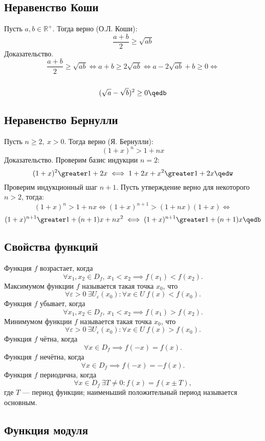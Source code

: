 \subsection{Неравенство Коши}

Пусть $a,b\in \mathbb{R}^+$. Тогда верно {\ital\color{desc}(О.Л. Коши)}:
$$\frac{a+b}{2}\geq \sqrt{ab}$$
{\bold Доказательство.}
$$\frac{a+b}{2}\geq \sqrt{ab}\iff a+b\geq 2\sqrt{ab}\iff a-2\sqrt{ab}+b\geq 0\iff$$
\\[-11pt]
$$(\sqrt{a}-\sqrt{b})^2\geq 0\qedb$$

\subsection{Неравенство Бернулли}

Пусть $n\geq 2,\ x\greater 0$. Тогда верно {\ital\color{desc}(Я. Бернулли)}:
$$(1+x)^n\greater 1+nx$$
{\bold Доказательство.} Проверим базис индукции $n=2$:
$$(1+x)^2\greater 1+2x\iff 1+2x+x^2\greater 1+2x\qedw$$
Проверим индукционный шаг $n+1$. Пусть утверждение верно для некоторого
$n\greater 2$, тогда:
$$(1+x)^n\greater 1+nx\iff (1+x)^{n+1}\greater (1+nx)(1+x)\iff$$
$$(1+x)^{n+1}\greater 1+(n+1)x+nx^2\iff (1+x)^{n+1}\greater 1+(n+1)x\qedb$$

\subsection{Свойства функций}

Функция $f$ {\ital возрастает}, когда
$$\forall x_1,x_2\in D_f,\ x_1\less x_2\implies f(x_1)\less f(x_2).$$
{\ital Максимумом} функции $f$ называется такая точка $x_0$, что
$$\forall\varepsilon\greater 0\ \exists U_\varepsilon(x_0)\colon\forall x\in U\ f(x)
\less f(x_0).$$
Функция $f$ {\ital убывает}, когда
$$\forall x_1,x_2\in D_f,\ x_1\less x_2\implies f(x_1)\greater f(x_2).$$
{\ital Минимумом} функции $f$ называется такая точка $x_0$, что
$$\forall\varepsilon\greater 0\ \exists U_\varepsilon(x_0)\colon\forall x\in U\ f(x)
\greater f(x_0).$$
Функция $f$ {\ital чётна}, когда
$$\forall x\in D_f\implies f(-x)=f(x).$$
Функция $f$ {\ital нечётна}, когда
$$\forall x\in D_f\implies f(-x)=-f(x).$$
Функция $f$ {\ital периодична}, когда
$$\forall x\in D_f\ \exists T\neq 0\colon f(x)=f(x\pm T),$$
где $T$ --- {\bold период} функции; наименьший положительный период называется
{\ital основным}.

\subsection{Функция модуля}

